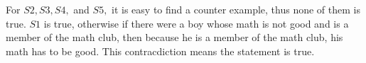 \begin{multicols}{2}
\begin{figure}[H]
		\vspace*{-10pt}
	\end{figure}
	For $S2,S3, S4,$ and $S5,$ it is easy to find a counter example, thus none of them is true.
	$S1$ is true, otherwise if there were a boy whose math is not good and is a member of the math club,
	then because he is a member of the math club, his math has to be good. This contracdiction means the statement is true.
\end{multicols}
\newpage
\begingroup
{}
\centering
\endgroup
\vspace*{30pt} 

